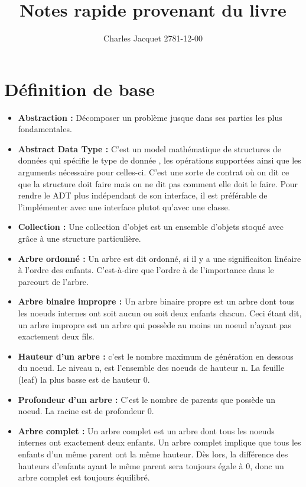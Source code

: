 \documentclass[a4paper]{article}
\title{Notes rapide provenant du livre}
\author{Charles Jacquet 2781-12-00}
\begin{document}
\maketitle

\section{Définition de base}
\begin{itemize}
\item \textbf{Abstraction : }Décomposer un problème jusque dans ses parties les plus fondamentales.

\item \textbf{Abstract Data Type : } C’est un model mathématique de structures de données qui spécifie le type de donnée , les opérations supportées ainsi que les arguments nécessaire pour celles-ci. C'est une sorte de contrat où on dit ce que la structure doit faire mais on ne dit pas comment elle doit le faire.
Pour rendre le ADT plus indépendant de son interface, il est préférable de l'implémenter avec une interface plutot qu'avec une classe.

\item \textbf{Collection : } Une collection d'objet est un ensemble d'objets stoqué avec grâce à une structure particulière.

\item \textbf{Arbre ordonné : } Un arbre est dit ordonné, si il y a une significaiton linéaire à l'ordre des enfants. C'est-à-dire que l'ordre à de l'importance dans le parcourt de l'arbre.

\item \textbf{Arbre binaire impropre : } Un arbre binaire propre est un arbre dont tous les noeuds internes ont soit aucun ou soit deux enfants chacun. Ceci étant dit, un arbre impropre est un arbre qui possède au moins un noeud n'ayant pas exactement deux fils.

\item \textbf{Hauteur d'un arbre : } c'est le nombre maximum de génération en dessous du noeud. Le niveau n, est l'ensemble des noeuds de hauteur n. La feuille (leaf) la plus basse est de hauteur 0.
\item \textbf{Profondeur d'un arbre : } C'est le nombre de parents que possède un noeud. La racine est de profondeur 0.

\item \textbf{Arbre complet : } Un arbre complet est un arbre dont tous les noeuds internes ont exactement deux enfants. Un arbre complet implique que tous les enfants d'un même parent ont la même hauteur. Dès lors, la différence des hauteurs d'enfants ayant le même parent sera toujours égale à 0, donc un arbre complet est toujours équilibré.


\end{itemize}
\end{document}
